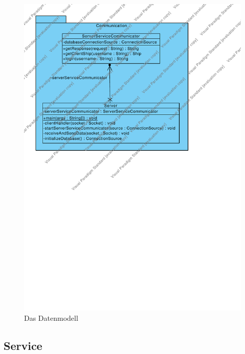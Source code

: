 \documentclass[fontsize=12pt,paper=a4,twoside]{scrartcl}
\begin{document}
\begin{figure}[H]
\begin{center}
  \includegraphics[width=\linewidth]{../GT_Modulsicht/src/CommServer.pdf}
    \caption{Das Datenmodell}
\end{center}
\end{figure}

\subsection{Service}
\end{document}
